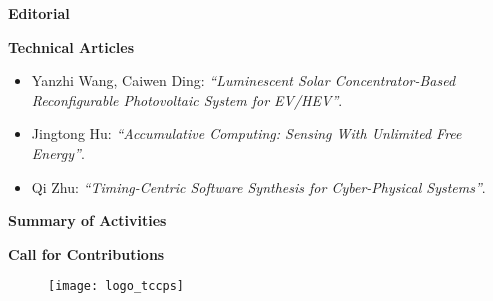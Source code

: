 {
\setlength{\parskip}{.2in}

\textbf{Editorial}

\textbf{Technical Articles}
\vspace{-.2in}
\begin{itemize}
    \item Yanzhi Wang, Caiwen Ding: 
    \textit{``Luminescent Solar Concentrator-Based Reconfigurable Photovoltaic System for EV/HEV''}.
    \item Jingtong Hu:
    \textit{``Accumulative Computing: Sensing With Unlimited Free Energy''}.
    \item Qi Zhu:
    \textit{``Timing-Centric Software Synthesis for Cyber-Physical Systems''}.
\end{itemize}

\textbf{Summary of Activities}

\textbf{Call for Contributions}

}


\begin{figure}[b!]
  \centering
  \texttt{[image: logo\_tccps]}
  \caption*{}
\end{figure}


